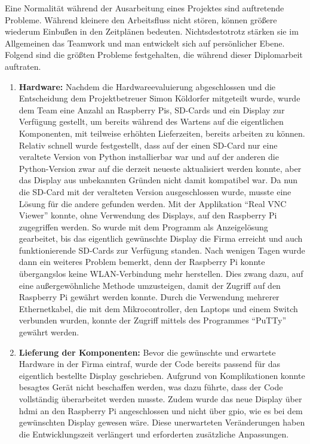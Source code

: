 Eine Normalität während der Ausarbeitung eines Projektes sind auftretende Probleme. Während kleinere den Arbeitsfluss nicht stören, können größere wiederum Einbußen in den Zeitplänen bedeuten. Nichtsdestotrotz stärken sie im Allgemeinen das Teamwork und man entwickelt sich auf persönlicher Ebene.\\ Folgend sind die größten Probleme festgehalten, die während dieser Diplomarbeit auftraten.

\begin{enumerate}

	\item \textbf{Hardware:} Nachdem die Hardwareevaluierung abgeschlossen und die Entscheidung dem Projektbetreuer Simon Köldorfer mitgeteilt wurde, wurde dem Team eine Anzahl an Raspberry Pis, SD-Cards und ein Display zur Verfügung gestellt, um bereits während des Wartens auf die eigentlichen Komponenten, mit teilweise erhöhten Lieferzeiten, bereits arbeiten zu können. Relativ schnell wurde festgestellt, dass auf der einen SD-Card nur eine veraltete Version von Python installierbar war und auf der anderen die Python-Version zwar auf die derzeit neueste aktualisiert werden konnte, aber das Display aus unbekannten Gründen nicht damit kompatibel war. Da nun die SD-Card mit der veralteten Version ausgeschlossen wurde, musste eine Lösung für die andere gefunden werden. Mit der Applikation \enquote{Real VNC Viewer} konnte, ohne Verwendung des Displays, auf den Raspberry Pi zugegriffen werden. So wurde mit dem Programm als Anzeigelösung gearbeitet, bis das eigentlich gewünschte Display die Firma erreicht und auch funktionierende SD-Cards zur Verfügung standen. Nach wenigen Tagen wurde dann ein weiteres Problem bemerkt, denn der Raspberry Pi konnte übergangslos keine WLAN-Verbindung mehr herstellen. Dies zwang dazu, auf eine außergewöhnliche Methode umzusteigen, damit der Zugriff auf den Raspberry Pi gewährt werden konnte. Durch die Verwendung mehrerer Ethernetkabel, die mit dem Mikrocontroller, den Laptops und einem Switch verbunden wurden, konnte der Zugriff mittels des Programmes \enquote{PuTTy} gewährt werden.
	\item \textbf{Lieferung der Komponenten:} Bevor die gewünschte und erwartete Hardware in der Firma eintraf, wurde der Code bereits passend für das eigentlich bestellte Display geschrieben. Aufgrund von Komplikationen konnte besagtes Gerät nicht beschaffen werden, was dazu führte, dass der Code vollständig überarbeitet werden musste. Zudem wurde das neue Display über \gls{hdmi} an den Raspberry Pi angeschlossen und nicht über \gls{gpio}, wie es bei dem gewünschten Display gewesen wäre. Diese unerwarteten Veränderungen haben die Entwicklungszeit verlängert und erforderten zusätzliche Anpassungen.

\end{enumerate}
